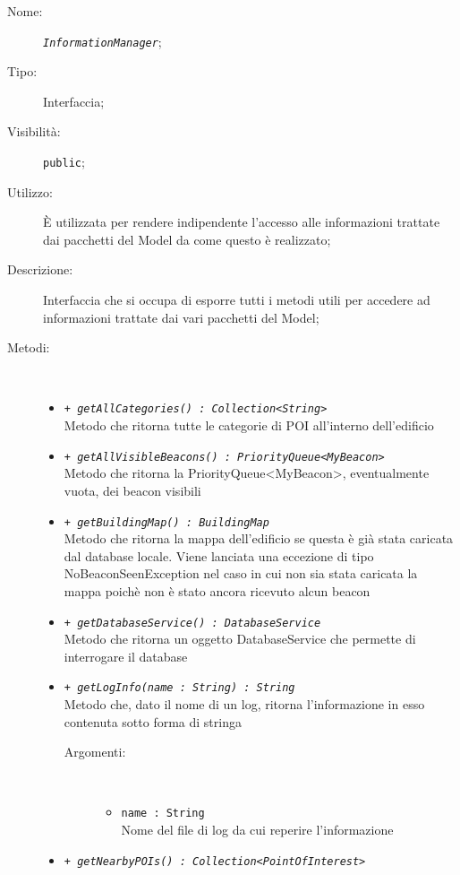 \documentclass[../DefinizioneDiProdotto.tex]{subfiles}
\begin{document}
    \begin{description}
\item[Nome:] \texttt{\textit{InformationManager}};
\item[Tipo:] Interfaccia;
\item[Visibilità:] \texttt{public};
\item[Utilizzo:] È utilizzata per rendere indipendente l'accesso alle informazioni trattate dai pacchetti del Model da come questo è realizzato;
\item[Descrizione:] Interfaccia che si occupa di esporre tutti i metodi utili per accedere ad informazioni trattate dai vari pacchetti del Model;
\item[Metodi:] \
\begin{itemize}
\item \texttt{+ \textit{getAllCategories() : Collection<String>}}\\
Metodo che ritorna tutte le categorie di POI all'interno dell'edificio
 \item \texttt{+ \textit{getAllVisibleBeacons() : PriorityQueue<MyBeacon>}}\\
Metodo che ritorna la PriorityQueue<MyBeacon>, eventualmente vuota, dei beacon visibili
 \item \texttt{+ \textit{getBuildingMap() : BuildingMap}}\\
Metodo che ritorna la mappa dell'edificio se questa è già stata caricata dal database locale. Viene lanciata una eccezione di tipo NoBeaconSeenException nel caso in cui non sia stata caricata la mappa poichè non è stato ancora ricevuto alcun beacon
 \item \texttt{+ \textit{getDatabaseService() : DatabaseService}}\\
Metodo che ritorna un oggetto DatabaseService che permette di interrogare il database
 \item \texttt{+ \textit{getLogInfo(name : String) : String}}\\
Metodo che, dato il nome di un log, ritorna l'informazione in esso contenuta sotto forma di stringa
 \begin{description}
\item[Argomenti:] \
\begin{itemize}
\item \texttt{name : String}\\
Nome del file di log da cui reperire l'informazione\end{itemize}
\end{description}
\item \texttt{+ \textit{getNearbyPOIs() : Collection<PointOfInterest>}}\\

\end{itemize}
\end{description}
\end{document}

